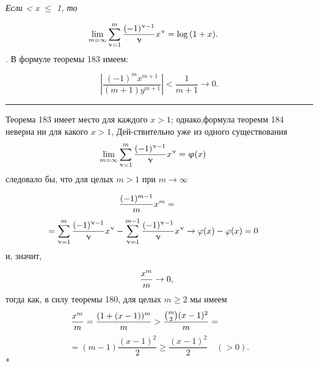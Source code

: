\documentclass[a5paper]{book}
\begin{document}
   \vspace{-1mm}{\bfseries \:Теорема 184. } \itshape Если   < \itshape x \upshape $\leqslant$ 1, \itshape то \upshape \par
   $$ \hspace{-5mm} \lim_{m = \infty} \sum_{\upnu = 1}^{m}  {\frac{(-1)^{\upnu - 1}}{\upnu}}x^{\upnu} = \log{}{(1+x)}.$$
    \:\:\;\quad{}. В формуле теоремы 183 имеем:\par
   $$ \left| {\frac{(-1)^{m}x^{m+1}}{(m+1)y^{m+1}}} \right| < \frac{1}{m + 1} \to 0.$$
    \quad \quad \quad \quad\quad \quad\quad\quad\quad\quad\quad\quad\quad\quad\quad\quad\quad\quad\quad\quad
   \begin{center}
   \rule{90pt}{1pt}
   \end{center}
   \;\linebreak\par
    Теорема 183 имеет место для каждого $x > 1$; однако,\linebreak формула теоремм 184 неверна ни для какого $x > 1$, Дей-\linebreak ствительно уже из одного существования
   $$ \hspace{-5mm} \lim_{m = \infty} \sum\limits_{\upnu = 1}^{m} {\frac{(-1)^{\upnu-1}}{\upnu}}x^{\upnu} = \upvarphi(x)$$
   следовало бы, что для целых $m > 1$ при $m \to \infty$ \par
   $$\hspace{-10mm} {\frac{(-1)^{m-1}}{m}}x^{m} =  $$
   $$ \hspace{-5mm} = \sum\limits_{\upnu = 1}^{m}{\frac{(-1)^{\upnu - 1}}{\upnu}}x^{\upnu} - \sum\limits_{\upnu = 1}^{m - 1}{\frac{(-1)^{\upnu - 1}}{\upnu}}x^{\upnu} \to \varphi(x) - \varphi(x) = 0 $$
   и, значит,\par
   $$\hspace{-2mm} \frac{x^m}{m} \to 0, $$
   тогда как, в силу теоремы 180, для целых $m \geqslant 2$ мы имеем\linebreak
  $$ \hspace{-12mm} {\frac{x^m}{m}} = {\frac{(1 + (x - 1))^m}{m}} > {\frac{{m \choose 2} (x - 1)^2}{m}} =  $$
  $$ = (m - 1) {\frac{(x - 1)^2}{2}} \geqslant {\frac{(x - 1)^2}{2}}  \quad(>0). $$
  \;\;*
  
   
\end{document}
